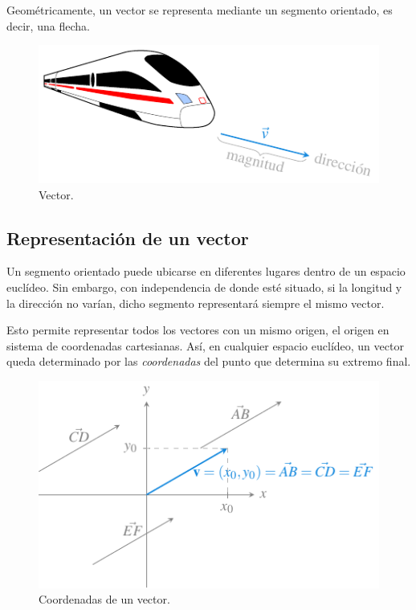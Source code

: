 \documentclass[
  a4paper,
]{scrreport}
\theoremstyle{definition}
\theoremstyle{plain}
\theoremstyle{plain}
\theoremstyle{plain}
\theoremstyle{definition}
\theoremstyle{remark}
\begin{document}
Geométricamente, un vector se representa mediante un segmento orientado,
es decir, una flecha.

\begin{figure}

{\centering \includegraphics{img/geometria-plano-espacio/vector.pdf}

}

\caption{Vector.}

\end{figure}

\hypertarget{representaciuxf3n-de-un-vector}{%
\subsection{Representación de un
vector}\label{representaciuxf3n-de-un-vector}}

Un segmento orientado puede ubicarse en diferentes lugares dentro de un
espacio euclídeo. Sin embargo, con independencia de donde esté situado,
si la longitud y la dirección no varían, dicho segmento representará
siempre el mismo vector.

Esto permite representar todos los vectores con un mismo origen, el
origen en sistema de coordenadas cartesianas. Así, en cualquier espacio
euclídeo, un vector queda determinado por las \emph{coordenadas} del
punto que determina su extremo final.

\begin{figure}

{\centering \includegraphics{img/geometria-plano-espacio/coordenadas-vector.pdf}

}

\caption{Coordenadas de un vector.}

\end{figure}
\end{document}

